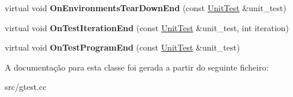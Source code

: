 \begin{DoxyCompactItemize}
\item 
\hypertarget{classtesting_1_1internal_1_1TestEventRepeater_a8428220c4cf9f0cea2dfd9a70f07ab7f}{virtual void {\bfseries On\-Environments\-Tear\-Down\-End} (const \hyperlink{classtesting_1_1UnitTest}{Unit\-Test} \&unit\-\_\-test)}\label{classtesting_1_1internal_1_1TestEventRepeater_a8428220c4cf9f0cea2dfd9a70f07ab7f}

\item 
\hypertarget{classtesting_1_1internal_1_1TestEventRepeater_a94253e3c11753328e8a031f39352708f}{virtual void {\bfseries On\-Test\-Iteration\-End} (const \hyperlink{classtesting_1_1UnitTest}{Unit\-Test} \&unit\-\_\-test, int iteration)}\label{classtesting_1_1internal_1_1TestEventRepeater_a94253e3c11753328e8a031f39352708f}

\item 
\hypertarget{classtesting_1_1internal_1_1TestEventRepeater_a4622616259747dbcc23f5ee39ef99ec0}{virtual void {\bfseries On\-Test\-Program\-End} (const \hyperlink{classtesting_1_1UnitTest}{Unit\-Test} \&unit\-\_\-test)}\label{classtesting_1_1internal_1_1TestEventRepeater_a4622616259747dbcc23f5ee39ef99ec0}

\end{DoxyCompactItemize}


A documentação para esta classe foi gerada a partir do seguinte ficheiro\-:\begin{DoxyCompactItemize}
\item 
src/gtest.\-cc\end{DoxyCompactItemize}

